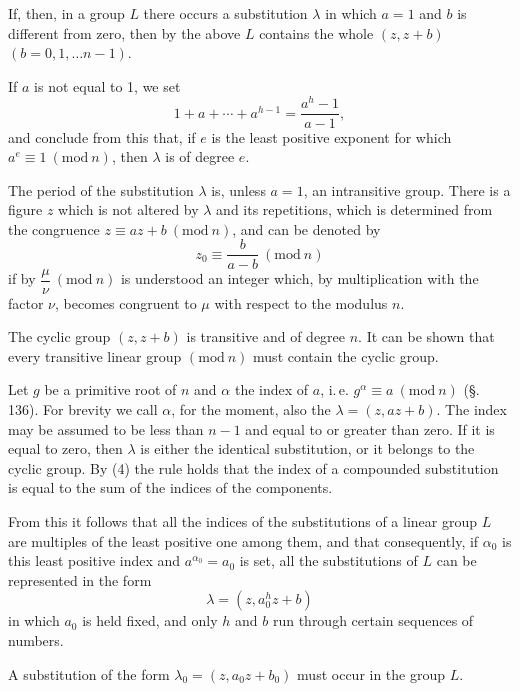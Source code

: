 
If, then, in a group $L$ there occurs a substitution $\lambda$ in which $a = 1$ and $b$ is different from zero, then by the above $L$ contains the whole  $(z, z + b)$ $(b = 0, 1, \ldots n - 1)$.

If $a$ is not equal to 1, we set
\[
1 + a + \cdots + a^{h-1} = \frac{a^h - 1}{a - 1},
\]
and conclude from this that, if $e$ is the least positive exponent for which $a^e \equiv 1\ (\mathrm{mod}\ n)$, then $\lambda$ is of degree $e$.

The period of the substitution $\lambda$ is, unless $a = 1$, an intransitive group. There is a figure $z$ which is not altered by $\lambda$ and its repetitions, which is determined from the congruence $z \equiv az + b\ (\mathrm{mod}\ n)$, and can be denoted by
\[
z_0 \equiv \frac{b}{a - b}\ (\mathrm{mod}\ n)
\]
if by $\dfrac{\mu}{\nu}\ (\mathrm{mod}\ n)$ is understood an integer which, by multiplication with the factor $\nu$, becomes congruent to $\mu$ with respect to the modulus $n$.

The cyclic group $(z, z + b)$ is transitive and of degree $n$. It can be shown that every transitive linear group $(\mathrm{mod}\ n)$ must contain the cyclic group.

Let $g$ be a primitive root of $n$ and $\alpha$ the index of $a$, i.\,e. $g^\alpha \equiv a\ (\mathrm{mod}\ n)$ (\S.\,136). For brevity we call $\alpha$, for the moment, also the  $\lambda = (z, az + b)$. The index may be assumed to be less than $n - 1$ and equal to or greater than zero. If it is equal to zero, then $\lambda$ is either the identical substitution, or it belongs to the cyclic group. By (4) the rule holds that the index of a compounded substitution is equal to the sum of the indices of the components.

From this it follows that all the indices of the substitutions of a linear group $L$ are multiples of the least positive one among them, and that consequently, if $\alpha_0$ is this least positive index and $a^{\alpha_0} = a_0$ is set, all the substitutions of $L$ can be represented in the form
\[
\lambda = (z, a_0^h z + b)
\]
in which $a_0$ is held fixed, and only $h$ and $b$ run through certain sequences of numbers.

A substitution of the form $\lambda_0 = (z, a_0 z + b_0)$ must occur in the group $L$.
